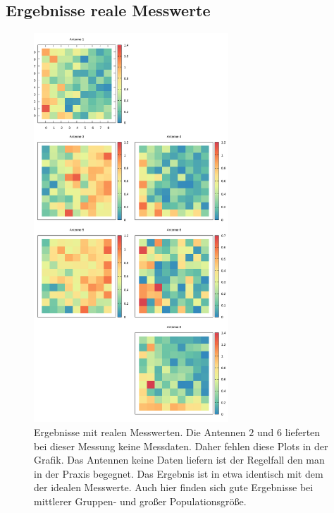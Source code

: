 \subsection{Ergebnisse reale Messwerte}
%
\begin{figure}[h!]
	\centering
	\caption[Ergebnis-Heatmap - Reale Messwerte]{ Ergebnisse mit realen Messwerten. Die Antennen $2$ und $6$ lieferten bei dieser Messung keine Messdaten. Daher fehlen diese Plots in der Grafik. Das Antennen keine Daten liefern ist der Regelfall den man in der Praxis begegnet. Das Ergebnis ist in etwa identisch mit dem der idealen Messwerte. Auch hier finden sich gute Ergebnisse bei mittlerer Gruppen- und großer Populationsgröße.}
	\label{fig:results2}
	\includegraphics[width=0.65\textwidth]{img/resultRealData.png}
\end{figure}
%
